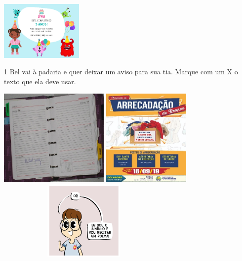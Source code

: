 {\includegraphics[width=1.58681in,height=1.13333in]{media/image92.png}
}



\num{1} Bel vai à padaria e quer deixar um aviso para sua tia. 
Marque com um X o texto que ela deve usar.


\includegraphics[width=2.10625in,height=1.86042in]{media/image93.jpeg}
\includegraphics[width=1.68611in,height=1.86042in]{media/image94.jpeg}
\includegraphics[width=3.36528in,height=1.53611in]{media/image97.png}

